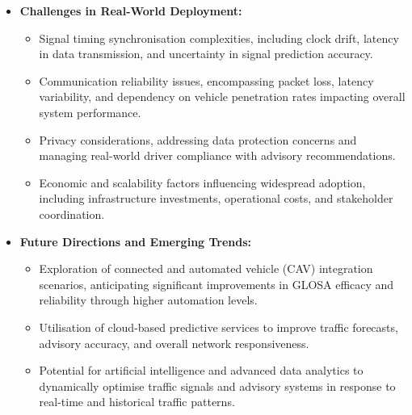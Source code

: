 \begin{itemize}
    \item \textbf{Challenges in Real-World Deployment:}
    \begin{itemize}
        \item Signal timing synchronisation complexities, including clock drift, latency in data transmission, and uncertainty in signal prediction accuracy.
        \item Communication reliability issues, encompassing packet loss, latency variability, and dependency on vehicle penetration rates impacting overall system performance.
        \item Privacy considerations, addressing data protection concerns and managing real-world driver compliance with advisory recommendations.
        \item Economic and scalability factors influencing widespread adoption, including infrastructure investments, operational costs, and stakeholder coordination.
    \end{itemize}

    \item \textbf{Future Directions and Emerging Trends:}
    \begin{itemize}
        \item Exploration of connected and automated vehicle (CAV) integration scenarios, anticipating significant improvements in GLOSA efficacy and reliability through higher automation levels.
        \item Utilisation of cloud-based predictive services to improve traffic forecasts, advisory accuracy, and overall network responsiveness.
        \item Potential for artificial intelligence and advanced data analytics to dynamically optimise traffic signals and advisory systems in response to real-time and historical traffic patterns.
    \end{itemize}

\end{itemize}


